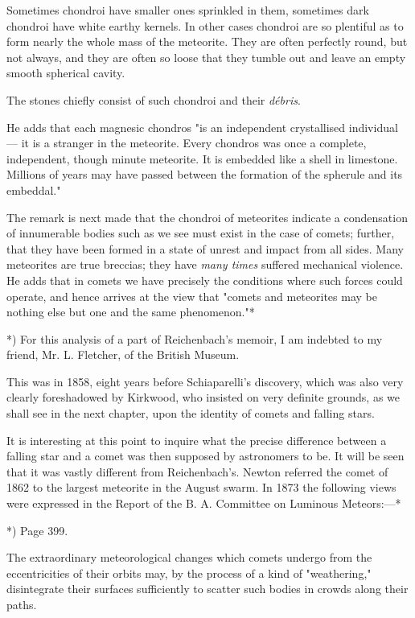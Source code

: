 \documentclass[a4paper, 12pt, oneside, polutonikogreek, english]{article}
\begin{document}
Sometimes chondroi have smaller ones sprinkled in them, sometimes dark chondroi have white earthy kernels. In other cases chondroi are so plentiful as to form nearly the whole mass of the meteorite. They are often perfectly round, but not always, and they are often so loose that they tumble out and leave an empty smooth spherical cavity.

The stones chiefly consist of such chondroi and their \emph{débris}.

He adds that each magnesic chondros "is an independent crystallised individual --- it is a stranger in the meteorite. Every chondros was once a complete, independent, though minute meteorite. It is embedded like a shell in limestone. Millions of years may have passed between the formation of the spherule and its embeddal."

The remark is next made that the chondroi of meteorites indicate a condensation of innumerable bodies such as we see must exist in the case of comets; further, that they have been formed in a state of unrest and impact from all sides. Many meteorites are true breccias; they have \emph{many times} suffered mechanical violence. He adds that in comets we have precisely the conditions where such forces could operate, and hence arrives at the view that "comets and meteorites may be nothing else but one and the same phenomenon."*

*) For this analysis of a part of Reichenbach's memoir, I am indebted to my friend, Mr. L. Fletcher, of the British Museum.

This was in 1858, eight years before Schiaparelli's discovery, which was also very clearly foreshadowed by Kirkwood, who insisted on very definite grounds, as we shall see in the next chapter, upon the identity of comets and falling stars.

It is interesting at this point to inquire what the precise difference between a falling star and a comet was then supposed by astronomers to be. It will be seen that it was vastly different from Reichenbach's. Newton referred the comet of 1862 to the largest meteorite in the August swarm. In 1873 the following views were expressed in the Report of the B. A. Committee on Luminous Meteors:---*

*) Page 399.

The extraordinary meteorological changes which comets undergo from the eccentricities of their orbits may, by the process of a kind of "weathering," disintegrate their surfaces sufficiently to scatter such bodies in crowds along their paths.
\end{document}
